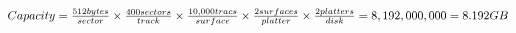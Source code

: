\documentclass{article}
\begin{document}
$Capacity = \frac{512 bytes}{sector} \times \frac{400 sectors}{track} \times
\frac{10,000 tracs}{surface} \times \frac{2 surfaces}{platter} \times
\frac{2 platters}{disk} \\ = 8,192,000,000 \\ = 8.192GB$
\end{document}
